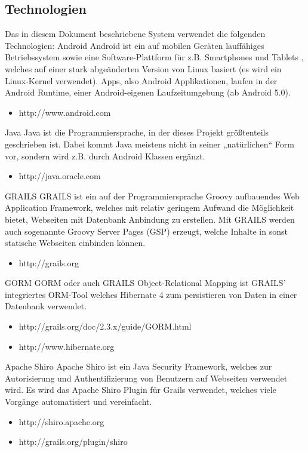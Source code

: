 \subsection{Technologien}
Das in diesem Dokument beschriebene System verwendet die folgenden Technologien:
Android
Android ist ein auf mobilen Ger\"aten lauff\"ahiges Betriebssystem sowie eine Software-Plattform f\"ur z.B. Smartphones und Tablets , welches auf einer stark abgeänderten Version von Linux basiert (es wird ein Linux-Kernel verwendet). Apps, also Android Applikationen, laufen in der Android Runtime, einer Android-eigenen Laufzeitumgebung (ab Android 5.0).
\begin{itemize}
\item http://www.android.com
\end{itemize}
Java
Java ist die Programmiersprache, in der dieses Projekt größtenteils geschrieben ist. Dabei kommt Java meistens nicht in seiner „natürlichen“ Form vor, sondern wird z.B. durch Android Klassen ergänzt.
\begin{itemize}
\item http://java.oracle.com
\end{itemize}
GRAILS
GRAILS ist ein auf der Programmiersprache Groovy aufbauendes Web Application Framework, welches mit relativ geringem Aufwand die Möglichkeit bietet, Webseiten mit Datenbank Anbindung zu erstellen. Mit GRAILS werden auch sogenannte Groovy Server Pages (GSP) erzeugt, welche Inhalte in sonst statische Webseiten einbinden können.
\begin{itemize}
\item http://grails.org
\end{itemize}
GORM
GORM oder auch GRAILS Object-Relational Mapping ist GRAILS' integriertes ORM-Tool welches Hibernate 4 zum persistieren von Daten in einer Datenbank verwendet.
\begin{itemize}
\item http://grails.org/doc/2.3.x/guide/GORM.html
\item http://www.hibernate.org
\end{itemize}
Apache Shiro
Apache Shiro ist ein Java Security Framework, welches zur Autorisierung und Authentifizierung von Benutzern auf Webseiten verwendet wird. Es wird das Apache Shiro Plugin für Grails verwendet, welches viele Vorgänge automatisiert und vereinfacht.
\begin{itemize}
\item http://shiro.apache.org
\item http://grails.org/plugin/shiro
\end{itemize}
